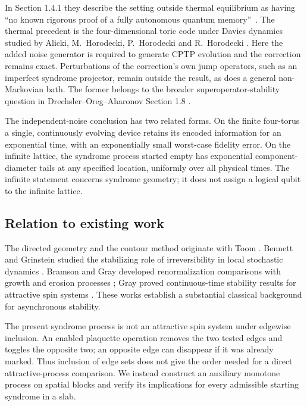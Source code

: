In Section 1.4.1 they describe the setting outside thermal equilibrium
as having \textquotedblleft no known rigorous proof of a fully
autonomous quantum memory\textquotedblright\ \cite{DOA}.
The thermal precedent is the four-dimensional toric code under
Davies dynamics studied by Alicki, M.~Horodecki, P.~Horodecki and
R.~Horodecki \cite{AHHH2010}.
Here the added noise generator is required to generate CPTP evolution
and the correction remains exact. Perturbations of the correction's
own jump operators, such as an imperfect syndrome projector, remain
outside the result, as does a general non-Markovian bath.
The former belongs to the broader superoperator-stability question
in Drechsler--Oreg--Aharonov Section 1.8 \cite{DOA}.

The independent-noise conclusion has two related forms. On the finite four-torus a
single, continuously evolving device retains its encoded information
for an exponential time, with an exponentially small worst-case
fidelity error. On the infinite lattice, the syndrome process started
empty has exponential component-diameter tails at any specified
location, uniformly over all physical times. The infinite statement
concerns syndrome geometry; it does not assign a logical qubit to the
infinite lattice.

\subsection{Relation to existing work}

The directed geometry and the contour method originate with Toom
\cite{Toom}. Bennett and Grinstein studied the stabilizing role of
irreversibility in local stochastic dynamics \cite{BennettGrinstein}.
Bramson and Gray developed renormalization comparisons with growth and
erosion processes \cite{BramsonGray}; Gray proved continuous-time
stability results for attractive spin systems
\cite{Gray}. These works establish a substantial classical
background for asynchronous stability.

The present syndrome process is not an attractive spin system under
edgewise inclusion. An enabled plaquette operation removes the two
tested edges and toggles the opposite two; an opposite edge can
disappear if it was already marked. Thus inclusion of edge sets does
not give the order needed for a direct attractive-process comparison.
We instead construct an auxiliary monotone process on spatial blocks
and verify its implications for every admissible starting syndrome in
a slab.

